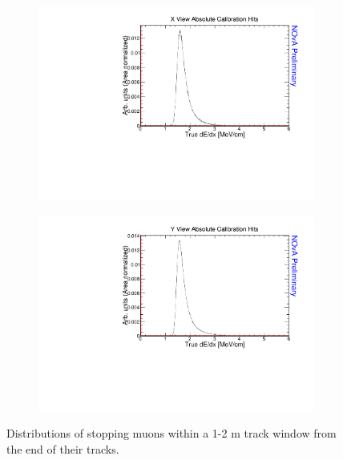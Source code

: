 \begin{figure}[ht!]
\begin{subfigure}{0.5\textwidth}
  \end{subfigure}
  \begin{subfigure}{0.5\textwidth}
    \includegraphics[width=\linewidth]{essentialsec_tb/nhits_mev_x.pdf}
  \end{subfigure}
  \begin{subfigure}{0.5\textwidth}
    \includegraphics[width=\linewidth]{essentialsec_tb/nhits_mev_y.pdf}
  \end{subfigure}
  \caption{Distributions of stopping muons within a 1-2 m track window from the end of their tracks.}
  \label{fig:AbsCalibNHitsMEU}
\end{figure}

